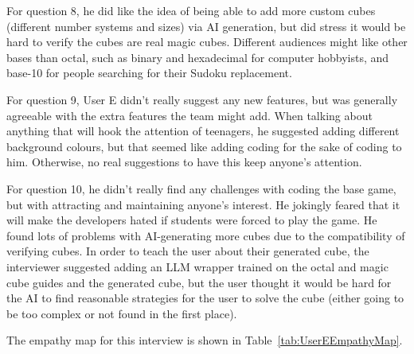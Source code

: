 \documentclass{article}
\begin{document}
For question 8, he did like the idea of being able to add more custom cubes (different number systems and sizes) via AI generation, but did stress it would be hard to verify the cubes are real magic cubes. Different audiences might like other bases than octal, such as binary and hexadecimal for computer hobbyists, and base-10 for people searching for their Sudoku replacement.

For question 9, User E didn't really suggest any new features, but was generally agreeable with the extra features the team might add. When talking about anything that will hook the attention of teenagers, he suggested adding different background colours, but that seemed like adding coding for the sake of coding to him. Otherwise, no real suggestions to have this keep anyone's attention.

For question 10, he didn't really find any challenges with coding the base game, but with attracting and maintaining anyone's interest. He jokingly feared that it will make the developers hated if students were forced to play the game. He found lots of problems with AI-generating more cubes due to the compatibility of verifying cubes. In order to teach the user about their generated cube, the interviewer suggested adding an LLM wrapper trained on the octal and magic cube guides and the generated cube, but the user thought it would be hard for the AI to find reasonable strategies for the user to solve the cube (either going to be too complex or not found in the first place). 

The empathy map for this interview is shown in Table~\ref{tab:UserEEmpathyMap}.
\end{document}
